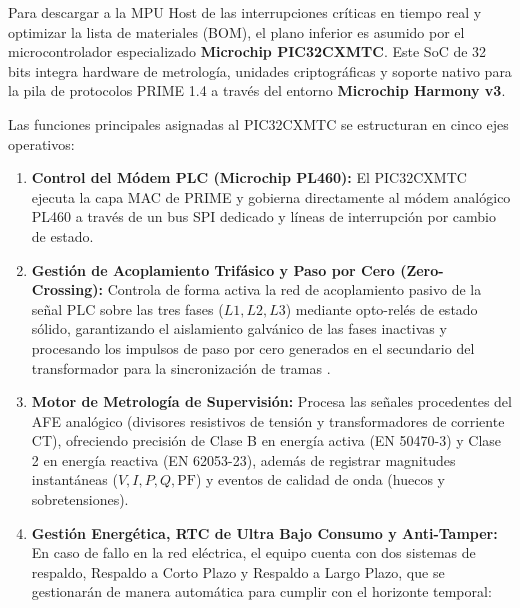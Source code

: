 Para descargar a la MPU Host de las interrupciones críticas en tiempo real y optimizar la lista de materiales (BOM), el plano inferior es asumido por el microcontrolador especializado \textbf{Microchip PIC32CXMTC}. Este SoC de 32 bits integra hardware de metrología, unidades criptográficas y soporte nativo para la pila de protocolos PRIME 1.4 a través del entorno \textbf{Microchip Harmony v3}.

Las funciones principales asignadas al PIC32CXMTC se estructuran en cinco ejes operativos:

\begin{enumerate}
    \item \textbf{Control del Módem PLC (Microchip PL460):} El PIC32CXMTC ejecuta la capa MAC de PRIME y gobierna directamente al módem analógico PL460 a través de un bus SPI dedicado y líneas de interrupción por cambio de estado.
    
    \item \textbf{Gestión de Acoplamiento Trifásico y Paso por Cero (Zero-Crossing):} Controla de forma activa la red de acoplamiento pasivo de la señal PLC sobre las tres fases ($L1, L2, L3$) mediante opto-relés de estado sólido, garantizando el aislamiento galvánico de las fases inactivas y procesando los impulsos de paso por cero generados en el secundario del transformador para la sincronización de tramas \cite{5764420}.

    \item \textbf{Motor de Metrología de Supervisión:} Procesa las señales procedentes del AFE analógico (divisores resistivos de tensión y transformadores de corriente CT), ofreciendo precisión de Clase B en energía activa (EN 50470-3) y Clase 2 en energía reactiva (EN 62053-23), además de registrar magnitudes instantáneas ($V, I, P, Q, \text{PF}$) y eventos de calidad de onda (huecos y sobretensiones).

    \item \textbf{Gestión Energética, RTC de Ultra Bajo Consumo y Anti-Tamper:} 
    En caso de fallo en la red eléctrica, el equipo cuenta con dos sistemas de respaldo, Respaldo a Corto Plazo y Respaldo a Largo Plazo, que se gestionarán de manera automática para cumplir con el horizonte temporal: %


\end{enumerate}
